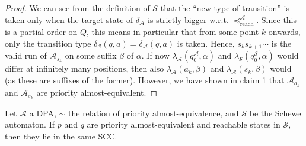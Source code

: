 \begin{proof}
	We can see from the definition of $\mathcal{S}$ that the \enquote{new type of transition} is taken only when the target state of $\delta_\mathcal{A}$ is strictly bigger w.r.t. $\preceq_\text{reach}^\mathcal{A}$. Since this is a partial order on $Q$, this means in particular that from some point $k$ onwards, only the transition type $\delta_\mathcal{S}(q, a) = \delta_\mathcal{A}(q, a)$ is taken. Hence, $s_k s_{k+1} \cdots$ is the valid run of $\mathcal{A}_{s_k}$ on some suffix $\beta$ of $\alpha$. If now $\lambda_\mathcal{A}(q_0^\mathcal{A}, \alpha)$ and $\lambda_\mathcal{S}(q_0^\mathcal{S}, \alpha)$ would differ at infinitely many positions, then also $\lambda_\mathcal{A}(a_k, \beta)$ and $\lambda_\mathcal{A}(s_k, \beta)$ would (as these are suffixes of the former). However, we have shown in claim 1 that $\mathcal{A}_{a_k}$ and $\mathcal{A}_{s_k}$ are priority almost-equivalent.
\end{proof}


\begin{lem}
	Let $\mathcal{A}$ a DPA, $\sim$ the relation of priority almost-equivalence, and $\mathcal{S}$ be the Schewe automaton. If $p$ and $q$ are priority almost-equivalent and reachable states in $\mathcal{S}$, then they lie in the same SCC.
\end{lem}

